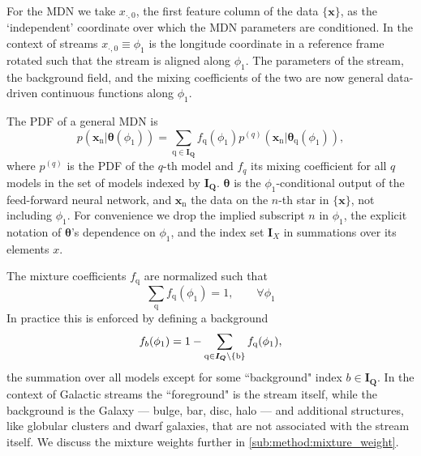 \documentclass[twocolumn]{aastex631}
\newcommand{\mrm}[1]{\mathrm{#1}}
\newcommand{\mbs}[1]{\boldsymbol{#1}}
\newcommand{\mbf}[1]{\mathbf{#1}}
\newcommand{\pdf}{p}
\newcommand{\nth}[1]{{#1}_{\mrm{n}}}  %
\newcommand{\qth}[1]{{#1}_{\mrm{q}}}  %
\newcommand{\smallcomponent}[2]{#2^{\scriptscriptstyle (#1)}}
\newcommand{\cmp}[2]{\smallcomponent{#1}{#2}}
\begin{document}
        For the MDN we take $x_{\cdot, 0}$, the first feature column of the data
        $\{\mbf{x}\}$, as the `independent' coordinate over which the MDN
        parameters are conditioned. In the context of streams $x_{\cdot, 0}
        \equiv \phi_1$ is the longitude coordinate in a reference frame rotated
        such that the stream is aligned along $\phi_1$. The parameters of the
        stream, the background field, and the mixing coefficients of the two are
        now general data-driven continuous functions along $\phi_1$.

        The PDF of a general MDN is
        \begin{equation} \label{eq:general_mixture_network}
            \!\!\! \pdf(\nth{\mbs{x}} | \mbs{\theta}(\phi_1))
            \!=\! \sum_{\mrm{q} \in \mbs{I_Q}} \! \qth{f}(\phi_1) \cmp{q}{\pdf}\left(\nth{\mbs{x}}|\qth{\mbs{\theta}}(\phi_1)\right),
        \end{equation}
        where $\cmp{q}{\pdf}$ is the PDF of the $q$-th model and $f_q$ its
        mixing coefficient for all $q$ models in the set of models indexed by
        $\mbs{I_Q}$. $\mbs{\theta}$ is the $\phi_1$-conditional output of the
        feed-forward neural network, and $\nth{\mbs{x}}$ the data on the $n$-th
        star in $\{\mbs{x}\}$, not including $\phi_1$. For convenience we drop
        the implied subscript $n$ in $\phi_1$, the explicit notation of
        $\mbs{\theta}$'s dependence on $\phi_1$, and the index set $\mbs{I}_X$
        in summations over its elements $x$.

        The mixture coefficients $\qth{f}$ are normalized such that
        \begin{equation} \label{eq:mixture_weight_sum}
            \sum_{\mrm{q}} \qth{f}(\phi_1) = 1, \qquad \forall \phi_1
        \end{equation}
        In practice this is enforced by defining a background
        \begin{equation} \label{eq:mixture_weight_normalization}
            f_{b}(\phi_1) = 1 - \sum_{\rm{q}\in \mbs{I_Q}\backslash \{b\}} \qth{f}(\phi_1),
        \end{equation}
        the summation over all models except for some ``background" index $b \in
        \mbs{I_Q}$.  In the context of Galactic streams the ``foreground" is the
        stream itself, while the background is the Galaxy --- bulge, bar, disc,
        halo --- and additional structures, like globular clusters and dwarf
        galaxies, that are not associated with the stream itself.  We discuss
        the mixture weights further in \autoref{sub:method:mixture_weight}.
\end{document}
